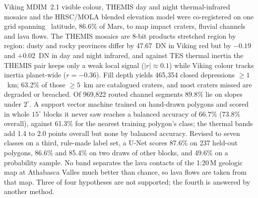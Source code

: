 Viking MDIM~2.1 visible colour, THEMIS day and night thermal-infrared mosaics and the HRSC/MOLA blended elevation
model were co-registered on one grid spanning \pmsixty\ latitude, 86.6\% of Mars, to map impact craters, fluvial
channels and lava flows. The THEMIS mosaics are 8-bit products stretched region by region: dusty and rocky provinces
differ by 47.67~DN in Viking red but by $-0.19$ and $+0.02$~DN in day and night infrared, and against TES
thermal inertia the THEMIS pair keeps only a weak local signal ($|r|\approx0.1$) while Viking colour tracks inertia
planet-wide ($r=-0.36$). Fill depth yields 465,354 closed depressions $\ge1$~km; 63.2\% of those $\ge5$~km are
catalogued craters, and most craters missed are degraded or breached. Of 969,822 routed channel segments 89.8\%
lie on slopes under $2^{\circ}$. A support vector machine trained on hand-drawn polygons and scored in whole
$15^{\circ}$ blocks it never saw reaches a balanced accuracy of 66.7\% (73.8\% overall), against 61.3\% for the nearest
training polygon's class; the thermal bands add 1.4 to 2.0 points overall but none by balanced accuracy. Revised to
seven classes on a third, rule-made label set, a U-Net scores 87.6\% on 237 held-out polygons, 86.6\% and 85.4\% on two
draws of other blocks, and 49.6\% on a probability sample. No band separates the lava contacts of the 1:20\,M geologic
map at Athabasca Valles much better than chance, so lava flows are taken from that map. Three of four hypotheses are not
supported; the fourth is answered by another method.

